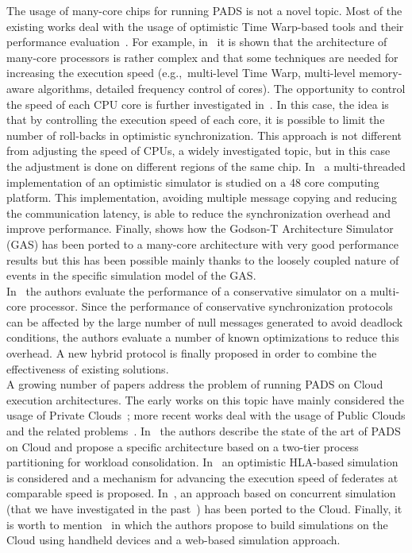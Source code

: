 \documentclass[1p]{elsarticle}
\begin{document}
The usage of many-core chips for running PADS is not a novel topic.
Most of the existing works deal with the usage of optimistic Time
Warp-based tools and their performance
evaluation~\cite{simul2011,Child:2012:DAC:2372596.2372609,6267855}.
For example, in~\cite{simul2011} it is shown that the architecture of
many-core processors is rather complex and that some techniques are
needed for increasing the execution speed (e.g.,~multi-level Time
Warp, multi-level memory-aware algorithms, detailed frequency control
of cores). The opportunity to control the speed of each CPU core is
further investigated in~\cite{Child:2012:DAC:2372596.2372609}. In this
case, the idea is that by controlling the execution speed of each
core, it is possible to limit the number of roll-backs in optimistic
synchronization. This approach is not different from adjusting the
speed of CPUs, a widely investigated topic, but in this case the
adjustment is done on different regions of the same
chip. In~\cite{6267855} a multi-threaded implementation of an
optimistic simulator is studied on a 48 core computing platform. This
implementation, avoiding multiple message copying and reducing the
communication latency, is able to reduce the synchronization overhead
and improve performance. Finally, \cite{HuiweiLv:2010:PPC:2015554.2015814} 
shows how the Godson-T Architecture Simulator (GAS) has been ported to
a many-core architecture with very good performance results but this has 
been possible mainly thanks to the loosely coupled nature of events in the
specific simulation model of the GAS.\\
In~\cite{MunckVB14} the authors evaluate the performance of a
conservative simulator on a multi-core processor. Since the performance
of conservative synchronization protocols can be affected by the large
number of null messages generated to avoid deadlock conditions, the
authors evaluate a number of known optimizations to reduce this
overhead. A new hybrid protocol is finally proposed in order to
combine the effectiveness of existing solutions.\\

A growing number of papers address the problem of running PADS on
Cloud execution architectures. The early works on this topic have
mainly considered the usage of Private
Clouds~\cite{fuj2010-cloud1,fuj2010-cloud2,5564701};
more recent works deal with the usage of Public Clouds and the related
problems~\cite{Vanmechelen2013126,Yoginath:2013:EEC:2486092.2486118,Aizstrauts:2012:ECE:2230596.2230628}.
In~\cite{Liu2012,Liu:2012:CSS:2372596.2372613} the authors describe
the state of the art of PADS on Cloud and propose a specific
architecture based on a two-tier process partitioning for workload
consolidation. In~\cite{Li:2013:AOH:2486092.2486119} an optimistic
HLA-based simulation is considered and a mechanism for advancing the
execution speed of federates at comparable speed is
proposed. In~\cite{6245700}, an approach based on concurrent
simulation (that we have investigated in the
past~\cite{gda-pads-2005}) has been ported to the Cloud.  Finally, it
is worth to mention~\cite{Mancini:2012:SCU:2310096.2310201} in which
the authors propose to build simulations on the Cloud using handheld
devices and a web-based simulation approach.\\
\end{document}

